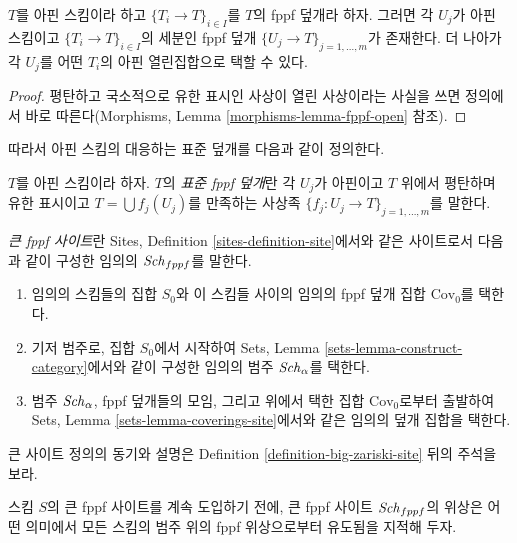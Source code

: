 \begin{lemma}
\label{lemma-fppf-affine}
$T$를 아핀 스킴이라 하고 $\{T_i \to T\}_{i \in I}$를 $T$의 fppf
덮개라 하자. 그러면 각 $U_j$가 아핀 스킴이고
$\{T_i \to T\}_{i \in I}$의 세분인 fppf 덮개
$\{U_j \to T\}_{j = 1, \ldots, m}$가 존재한다. 더 나아가 각 $U_j$를
어떤 $T_i$의 아핀 열린집합으로 택할 수 있다.
\end{lemma}

\begin{proof}
평탄하고 국소적으로 유한 표시인 사상이 열린 사상이라는 사실을 쓰면
정의에서 바로 따른다(Morphisms, Lemma
\ref{morphisms-lemma-fppf-open} 참조).
\end{proof}

\noindent
따라서 아핀 스킴의 대응하는 표준 덮개를 다음과 같이 정의한다.

\begin{definition}
\label{definition-standard-fppf}
$T$를 아핀 스킴이라 하자. $T$의 {\it 표준 fppf 덮개}란 각 $U_j$가
아핀이고 $T$ 위에서 평탄하며 유한 표시이고
$T = \bigcup f_j(U_j)$를 만족하는 사상족
$\{f_j : U_j \to T\}_{j = 1, \ldots, m}$를 말한다.
\end{definition}

\begin{definition}
\label{definition-big-fppf-site}
{\it 큰 fppf 사이트}란 Sites, Definition
\ref{sites-definition-site}에서와 같은 사이트로서 다음과 같이 구성한
임의의 $\mathit{Sch}_{fppf}$를 말한다.
\begin{enumerate}
\item 임의의 스킴들의 집합 $S_0$와 이 스킴들 사이의 임의의 fppf 덮개
집합 $\text{Cov}_0$를 택한다.
\item 기저 범주로, 집합 $S_0$에서 시작하여 Sets, Lemma
\ref{sets-lemma-construct-category}에서와 같이 구성한 임의의 범주
$\mathit{Sch}_\alpha$를 택한다.
\item 범주 $\mathit{Sch}_\alpha$, fppf 덮개들의 모임, 그리고 위에서 택한 집합
$\text{Cov}_0$로부터 출발하여 Sets, Lemma
\ref{sets-lemma-coverings-site}에서와 같은 임의의 덮개 집합을 택한다.
\end{enumerate}
\end{definition}

\noindent
큰 사이트 정의의 동기와 설명은 Definition
\ref{definition-big-zariski-site} 뒤의 주석을 보라.

\medskip\noindent
스킴 $S$의 큰 fppf 사이트를 계속 도입하기 전에, 큰 fppf 사이트
$\mathit{Sch}_{fppf}$의 위상은 어떤 의미에서 모든 스킴의 범주 위의 fppf
위상으로부터 유도됨을 지적해 두자.

